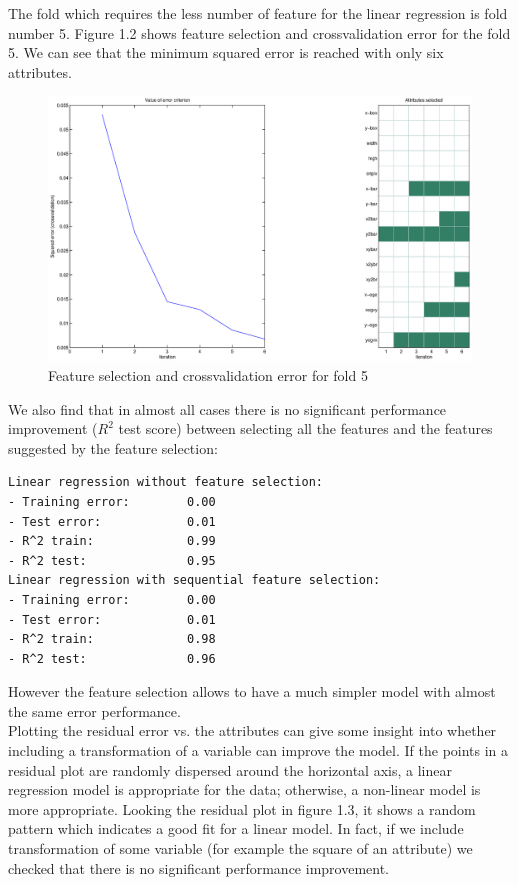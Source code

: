 The fold which requires the less number of feature for the linear regression is fold number 5. Figure 1.2 shows feature selection and crossvalidation error for the fold 5. We can see that the minimum squared error is reached with only six attributes.

\begin{figure}[htbp]
\center
\includegraphics[width = 1.0\textwidth]{figure_p2/r2.eps}
\caption{Feature selection and crossvalidation error for fold 5}
\end{figure}

We also find that in almost all cases there is no significant performance improvement ($R^2$ test score) between selecting all the features and the features suggested by the feature selection:
\begin{verbatim}
Linear regression without feature selection:
- Training error:        0.00
- Test error:            0.01
- R^2 train:             0.99
- R^2 test:              0.95
Linear regression with sequential feature selection:
- Training error:        0.00
- Test error:            0.01
- R^2 train:             0.98
- R^2 test:              0.96
\end{verbatim}

However the feature selection allows to have a much simpler model with almost the same error performance.\\

Plotting the residual error vs. the attributes can give some insight into whether including a transformation of a variable can improve the model. If the points in a residual plot are randomly dispersed around the horizontal axis, a linear regression model is appropriate for the data; otherwise, a non-linear model is more appropriate.
Looking the residual plot in figure 1.3, it shows a random pattern which indicates a good fit for a linear model.
In fact, if we include transformation of some variable (for example the square of an attribute) we checked that there is no significant performance improvement.

